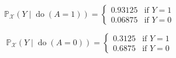 \documentclass[10pt]{article}
\begin{document}
\begin{equation}
    \mathbb{P}_{\mathcal{X}}(Y \mid \operatorname{do}(A=1))=
    \begin{cases}
        0.93125 & \text{if $Y=1$} \\
        0.06875 & \text{if $Y=0$}
    \end{cases}
  \end{equation}

  \begin{equation}
    \mathbb{P}_{\mathcal{X}}(Y \mid \operatorname{do}(A=0))=
    \begin{cases}
        0.3125 & \text{if $Y=1$} \\
        0.6875 & \text{if $Y=0$}
    \end{cases}
  \end{equation}
\end{document}
